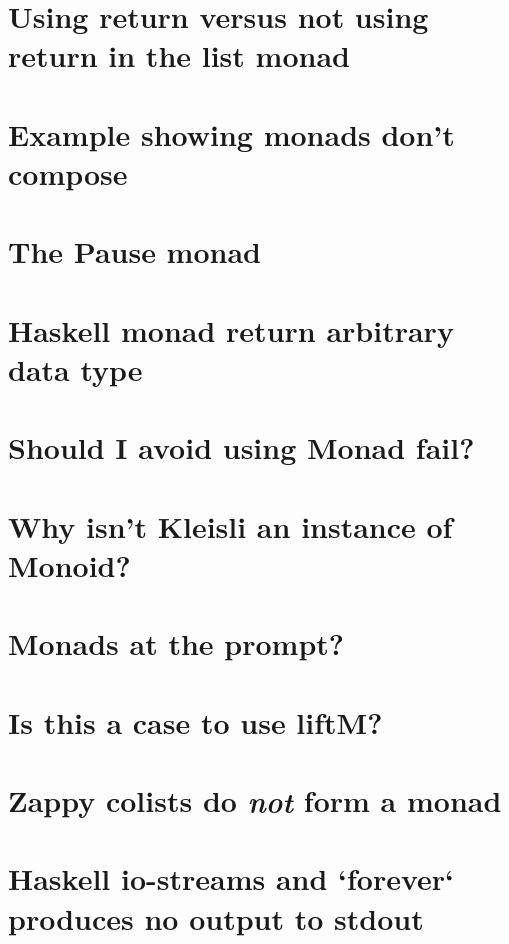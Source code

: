\documentclass{book}
\begin{document}
\section{Using return versus not using return in the list monad}


\section{Example showing monads don't compose}


\section{The Pause monad}


\section{Haskell monad return arbitrary data type}


\section{Should I avoid using Monad fail?}


\section{Why isn't Kleisli an instance of Monoid?}


\section{Monads at the prompt?}


\section{Is this a case to use liftM?}


\section{Zappy colists do \emph{not} form a monad}


\section{Haskell io-streams and `forever` produces no output to stdout}

\end{document}
